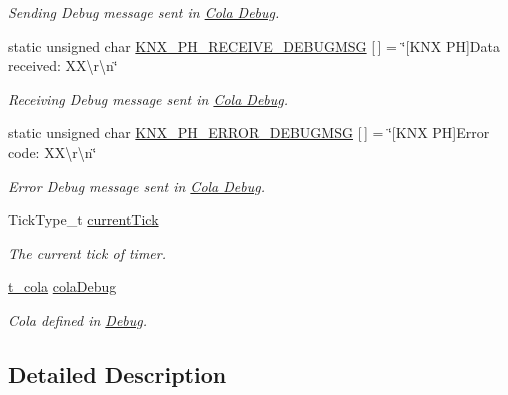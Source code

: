 \begin{DoxyCompactItemize}
\begin{DoxyCompactList}\small\item\em Sending Debug message sent in \hyperlink{group___cola___debug}{Cola Debug}. \end{DoxyCompactList}\item 
static unsigned char \hyperlink{group___k_n_x___p_h___sup___private___variables_ga29eb5f6a2e306cf5545c5a6af4623e35}{K\+N\+X\+\_\+\+P\+H\+\_\+\+R\+E\+C\+E\+I\+V\+E\+\_\+\+D\+E\+B\+U\+G\+M\+SG} \mbox{[}$\,$\mbox{]} = \char`\"{}\mbox{[}K\+NX PH\mbox{]}Data received\+: X\+X\textbackslash{}r\textbackslash{}n\char`\"{}\hypertarget{group___k_n_x___p_h___sup___private___variables_ga29eb5f6a2e306cf5545c5a6af4623e35}{}\label{group___k_n_x___p_h___sup___private___variables_ga29eb5f6a2e306cf5545c5a6af4623e35}

\begin{DoxyCompactList}\small\item\em Receiving Debug message sent in \hyperlink{group___cola___debug}{Cola Debug}. \end{DoxyCompactList}\item 
static unsigned char \hyperlink{group___k_n_x___p_h___sup___private___variables_ga598da98824813e3e2781a39bb3f90bfd}{K\+N\+X\+\_\+\+P\+H\+\_\+\+E\+R\+R\+O\+R\+\_\+\+D\+E\+B\+U\+G\+M\+SG} \mbox{[}$\,$\mbox{]} = \char`\"{}\mbox{[}K\+NX PH\mbox{]}Error code\+: X\+X\textbackslash{}r\textbackslash{}n\char`\"{}\hypertarget{group___k_n_x___p_h___sup___private___variables_ga598da98824813e3e2781a39bb3f90bfd}{}\label{group___k_n_x___p_h___sup___private___variables_ga598da98824813e3e2781a39bb3f90bfd}

\begin{DoxyCompactList}\small\item\em Error Debug message sent in \hyperlink{group___cola___debug}{Cola Debug}. \end{DoxyCompactList}\item 
Tick\+Type\+\_\+t \hyperlink{group___k_n_x___p_h___sup___private___variables_gae5c3d180a41e0a10e05863aa365a5596}{current\+Tick}\hypertarget{group___k_n_x___p_h___sup___private___variables_gae5c3d180a41e0a10e05863aa365a5596}{}\label{group___k_n_x___p_h___sup___private___variables_gae5c3d180a41e0a10e05863aa365a5596}

\begin{DoxyCompactList}\small\item\em The current tick of timer. \end{DoxyCompactList}\item 
\hyperlink{structt__cola}{t\+\_\+cola} \hyperlink{group___k_n_x___p_h___sup___private___variables_ga314fd637d927bd6a2551e119de623aa5}{cola\+Debug}\hypertarget{group___k_n_x___p_h___sup___private___variables_ga314fd637d927bd6a2551e119de623aa5}{}\label{group___k_n_x___p_h___sup___private___variables_ga314fd637d927bd6a2551e119de623aa5}

\begin{DoxyCompactList}\small\item\em Cola defined in \hyperlink{group___debug}{Debug}. \end{DoxyCompactList}\end{DoxyCompactItemize}


\subsection{Detailed Description}
